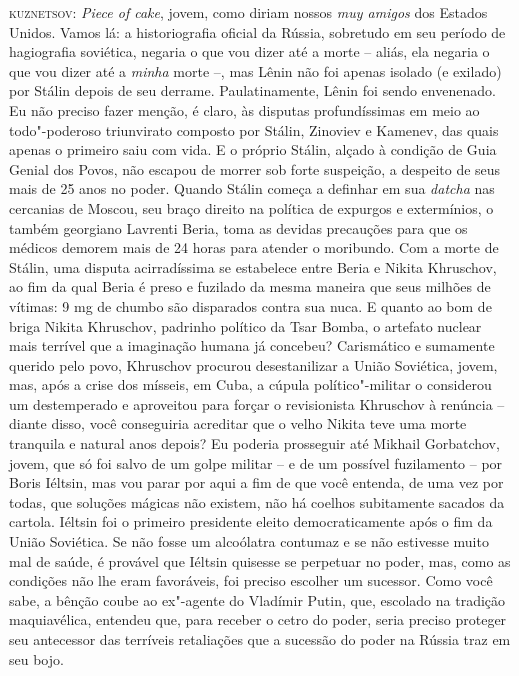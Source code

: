 \textsc{kuznetsov:} \emph{Piece of cake}, jovem, como diriam nossos
\emph{muy amigos} dos Estados Unidos. Vamos lá: a historiografia oficial
da Rússia, sobretudo em seu período de hagiografia soviética, negaria o
que vou dizer até a morte -- aliás, ela negaria o que vou dizer até a
\emph{minha} morte --, mas Lênin não foi apenas isolado (e exilado) por
Stálin depois de seu derrame. Paulatinamente, Lênin foi sendo
envenenado. Eu não preciso fazer menção, é claro, às disputas
profundíssimas em meio ao todo"-poderoso triunvirato composto por Stálin,
Zinoviev e Kamenev, das quais apenas o primeiro saiu com vida. E o
próprio Stálin, alçado à condição de Guia Genial dos Povos, não escapou
de morrer sob forte suspeição, a despeito de seus mais de 25 anos no
poder. Quando Stálin começa a definhar em sua \emph{datcha} nas
cercanias de Moscou, seu braço direito na política de expurgos e
extermínios, o também georgiano Lavrenti Beria, toma as devidas
precauções para que os médicos demorem mais de 24 horas para atender o
moribundo. Com a morte de Stálin, uma disputa acirradíssima se
estabelece entre Beria e Nikita Khruschov, ao fim da qual Beria é preso
e fuzilado da mesma maneira que seus milhões de vítimas: 9 mg de chumbo
são disparados contra sua nuca. E quanto ao bom de briga Nikita
Khruschov, padrinho político da Tsar Bomba, o artefato nuclear mais
terrível que a imaginação humana já concebeu? Carismático e sumamente
querido pelo povo, Khruschov procurou desestanilizar a União Soviética,
jovem, mas, após a crise dos mísseis, em Cuba, a cúpula político"-militar
o considerou um destemperado e aproveitou para forçar o revisionista
Khruschov à renúncia -- diante disso, você conseguiria acreditar que o
velho Nikita teve uma morte tranquila e natural anos depois? Eu poderia
prosseguir até Mikhail Gorbatchov, jovem, que só foi salvo de um golpe
militar -- e de um possível fuzilamento -- por Boris Iéltsin, mas vou
parar por aqui a fim de que você entenda, de uma vez por todas, que
soluções mágicas não existem, não há coelhos subitamente sacados da
cartola. Iéltsin foi o primeiro presidente eleito democraticamente após
o fim da União Soviética. Se não fosse um alcoólatra contumaz e se não
estivesse muito mal de saúde, é provável que Iéltsin quisesse se
perpetuar no poder, mas, como as condições não lhe eram favoráveis, foi
preciso escolher um sucessor. Como você sabe, a bênção coube ao
ex"-agente do  Vladímir Putin, que, escolado na tradição maquiavélica,
entendeu que, para receber o cetro do poder, seria preciso proteger seu
antecessor das terríveis retaliações que a sucessão do poder na Rússia
traz em seu bojo.

